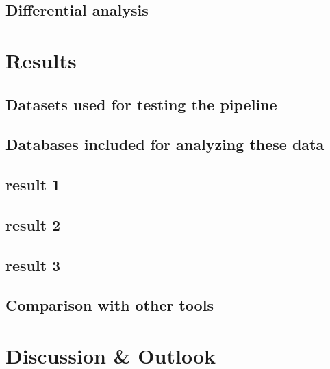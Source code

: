 \documentclass[12pt,twoside]{reedthesis}
\begin{document}
\hypertarget{differential-analysis}{%
\subsection{Differential analysis}\label{differential-analysis}}

\hypertarget{results-2}{%
\section{Results}\label{results-2}}

\hypertarget{datasets-used-for-testing-the-pipeline}{%
\subsection{Datasets used for testing the pipeline}\label{datasets-used-for-testing-the-pipeline}}

\hypertarget{databases-included-for-analyzing-these-data}{%
\subsection{Databases included for analyzing these data}\label{databases-included-for-analyzing-these-data}}

\hypertarget{result-1}{%
\subsection{result 1}\label{result-1}}

\hypertarget{result-2}{%
\subsection{result 2}\label{result-2}}

\hypertarget{result-3}{%
\subsection{result 3}\label{result-3}}

\hypertarget{comparison-with-other-tools}{%
\subsection{Comparison with other tools}\label{comparison-with-other-tools}}

\hypertarget{discussion-outlook}{%
\section{Discussion \& Outlook}\label{discussion-outlook}}
\end{document}
